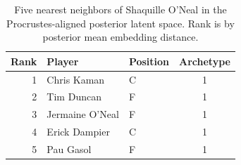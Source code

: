 \begin{table}[htbp]
  \centering\small
  \begin{tabular}{rllc}
    \toprule
    Rank & Player & Position & Archetype \\
    \midrule
    1 & Chris Kaman & C & 1 \\
    2 & Tim Duncan & F & 1 \\
    3 & Jermaine O'Neal & F & 1 \\
    4 & Erick Dampier & C & 1 \\
    5 & Pau Gasol & F & 1 \\
    \bottomrule
  \end{tabular}
  \caption{Five nearest neighbors of Shaquille O'Neal in the Procrustes-aligned posterior latent space. Rank is by posterior mean embedding distance.}
  \label{tab:Shaquille_O_Neal_neighbors}
\end{table}

